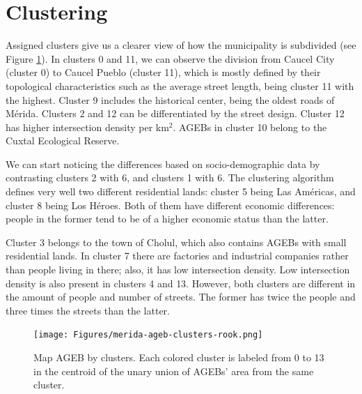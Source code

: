 \section{Clustering}
\label{sec:clustering}

Assigned clusters give us a clearer view of how the municipality is subdivided (see Figure \ref{fig:merida-ageb-clusters}). In clusters 0 and 11, we can observe the division from Caucel City (cluster 0) to Caucel Pueblo (cluster 11), which is mostly defined by their topological characteristics such as the average street length, being cluster 11 with the highest. Cluster 9 includes the historical center, being the oldest roads of Mérida. Clusters 2 and 12 can be differentiated by the street design. Cluster 12 has higher intersection density per km$^2$. AGEBs in cluster 10 belong to the Cuxtal Ecological Reserve.

We can start noticing the differences based on socio-demographic data by contrasting clusters 2 with 6, and clusters 1 with 6. The clustering algorithm defines very well two different residential lands: cluster 5 being Las Américas, and cluster 8 being Los Héroes. Both of them have different economic differences: people in the former tend to be of a higher economic status than the latter.

Cluster 3 belongs to the town of Cholul, which also contains AGEBs with small residential lands. In cluster 7 there are factories and industrial companies rather than people living in there; also, it has low intersection density. Low intersection density is also present in clusters 4 and 13. However, both clusters are different in the amount of people and number of streets. The former has twice the people and three times the streets than the latter.

\begin{figure}[htpb]
  \centering
  \texttt{[image: Figures/merida-ageb-clusters-rook.png]}
  \caption{Map AGEB by clusters. Each colored cluster is labeled from 0 to 13 in the centroid of the unary union of AGEBs' area from the same cluster.
    \label{fig:merida-ageb-clusters}}
\end{figure}

